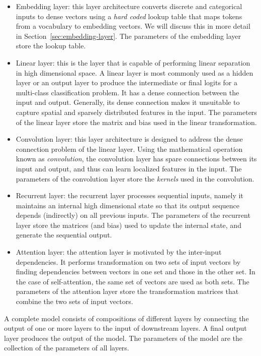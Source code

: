 \begin{itemize}
    \item Embedding layer: this layer architecture converts discrete and categorical inputs to dense vectors using a {\em hard coded} lookup table
    that maps tokens from a vocabulary to embedding vectors.  We will discuss this in more detail in Section~\ref{sec:embedding-layer}. The parameters
    of the embedding layer store the lookup table.
    \item Linear layer: this is the layer that is capable of performing linear separation in high dimensional space.  A linear layer is most commonly used
    as a hidden layer or an output layer to produce the intermediate or final logits for a multi-class classification problem.  It has
    a dense connection between the input and output.  Generally, its dense connection makes it unsuitable to capture spatial and sparsely distributed
    features in the input.  The parameters of the linear layer store the matrix and bias used in the linear transformation.
    \item Convolution layer: this layer architecture is designed to address the dense connection problem of the linear layer.  Using the mathematical
    operation known as {\em convolution}, the convolution layer has spare connections between its input and output, and thus can learn localized
    features in the input.  The parameters of the convolution layer store the {\em kernels} used in the convolution.
    \item Recurrent layer: the recurrent layer processes sequential inputs, namely it maintains an internal high dimensional state so that
    its output sequence depends (indirectly) on all previous inputs.  The parameters of the recurrent layer store the matrices (and bias)
    used to update the internal state, and generate the sequential output.
    \item Attention layer: the attention layer is motivated by the inter-input dependencies.  It performs transformation on two sets of input vectors
    by finding dependencies between vectors in one set and those in the other set.  In the case of self-attention, the same set of vectors
    are used as both sets. The parameters of the attention layer store the transformation matrices that combine the two sets of input vectors.
\end{itemize}

A complete model consists of compositions of different layers by connecting the output of one or more layers to the input of downstream layers.
A final output layer produces the output of the model.  The parameters of the model are the collection of the parameters of all layers.

